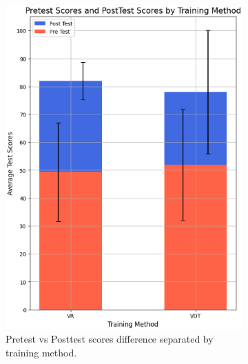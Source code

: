 \documentclass[manuscript]{./Models/acmart}
\begin{document}
\begin{figure}[h]
    \centering
    \begin{subfigure}[b]{0.4\textwidth}
        \centering
        \includegraphics[width=\textwidth]{Photos/ScoresGraph.PNG}
        \caption{Pretest vs Posttest scores difference separated by training method.}
        \label{fig:ScoresGraph}
    \end{subfigure}
    \hfill
    \begin{subfigure}[b]{0.51\textwidth}
        \centering

\end{subfigure}
\end{figure}
\end{document}

